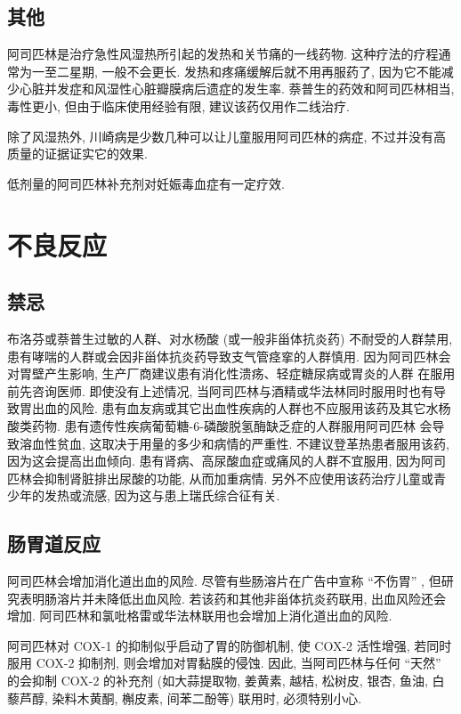 \subsection{其他}

阿司匹林是治疗急性风湿热所引起的发热和关节痛的一线药物.
这种疗法的疗程通常为一至二星期, 一般不会更长.
发热和疼痛缓解后就不用再服药了,
因为它不能减少心脏并发症和风湿性心脏瓣膜病后遗症的发生率.
萘普生的药效和阿司匹林相当, 毒性更小,
但由于临床使用经验有限, 建议该药仅用作二线治疗.

除了风湿热外, 川崎病是少数几种可以让儿童服用阿司匹林的病症,
不过并没有高质量的证据证实它的效果.

低剂量的阿司匹林补充剂对妊娠毒血症有一定疗效.

\section{不良反应}

\subsection{禁忌}

布洛芬或萘普生过敏的人群、对水杨酸
(或一般非甾体抗炎药) 不耐受的人群禁用,
患有哮喘的人群或会因非甾体抗炎药导致支气管痉挛的人群慎用.
因为阿司匹林会对胃壁产生影响,
生产厂商建议患有消化性溃疡、轻症糖尿病或胃炎的人群%
在服用前先咨询医师.
即使没有上述情况,
当阿司匹林与酒精或华法林同时服用时也有导致胃出血的风险.
患有血友病或其它出血性疾病的人群也不应服用该药及其它水杨酸类药物.
患有遗传性疾病葡萄糖-6-磷酸脱氢酶缺乏症的人群服用阿司匹林%
会导致溶血性贫血, 这取决于用量的多少和病情的严重性.
不建议登革热患者服用该药, 因为这会提高出血倾向.
患有肾病、高尿酸血症或痛风的人群不宜服用,
因为阿司匹林会抑制肾脏排出尿酸的功能, 从而加重病情.
另外不应使用该药治疗儿童或青少年的发热或流感,
因为这与患上瑞氏综合征有关.

\subsection{肠胃道反应}

阿司匹林会增加消化道出血的风险.
尽管有些肠溶片在广告中宣称 ``不伤胃'' ,
但研究表明肠溶片并未降低出血风险.
若该药和其他非甾体抗炎药联用, 出血风险还会增加.
阿司匹林和氯吡格雷或华法林联用也会增加上消化道出血的风险.

阿司匹林对 COX-1 的抑制似乎启动了胃的防御机制, 使 COX-2 活性增强,
若同时服用 COX-2 抑制剂, 则会增加对胃黏膜的侵蚀.
因此, 当阿司匹林与任何 ``天然'' 的会抑制 COX-2 的补充剂
(如大蒜提取物, 姜黄素, 越桔, 松树皮, 银杏,
鱼油, 白藜芦醇, 染料木黄酮, 槲皮素, 间苯二酚等)
联用时, 必须特别小心.

